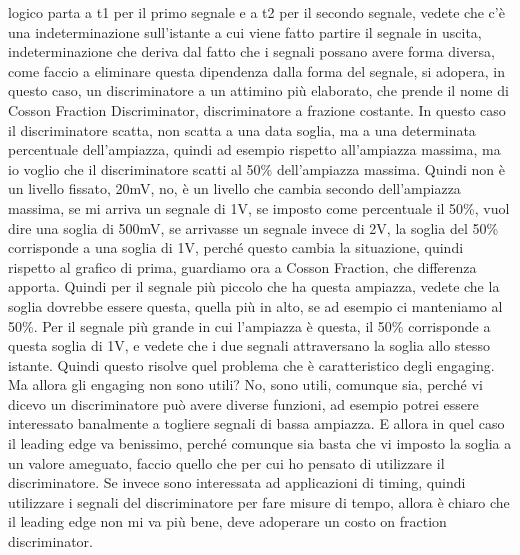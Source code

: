 logico parta a t1 per il primo segnale e a t2 per il secondo segnale, vedete che c'è una indeterminazione sull'istante a cui viene fatto partire il segnale in uscita, indeterminazione che deriva dal fatto che i segnali possano avere forma diversa, come faccio a eliminare questa dipendenza dalla forma del segnale, si adopera, in questo caso, un discriminatore a un attimino più elaborato, che prende il nome di Cosson Fraction Discriminator, discriminatore a frazione costante. In questo caso il discriminatore scatta, non scatta a una data soglia, ma a una determinata percentuale dell'ampiazza, quindi ad esempio rispetto all'ampiazza massima, ma io voglio che il discriminatore scatti al 50\% dell'ampiazza massima. Quindi non è un livello fissato, 20mV, no, è un livello che cambia secondo dell'ampiazza massima, se mi arriva un segnale di 1V, se imposto come percentuale il 50\%, vuol dire una soglia di 500mV, se arrivasse un segnale invece di 2V, la soglia del 50\% corrisponde a una soglia di 1V, perché questo cambia la situazione, quindi rispetto al grafico di prima, guardiamo ora a Cosson Fraction, che differenza apporta. Quindi per il segnale più piccolo che ha questa ampiazza, vedete che la soglia dovrebbe essere questa, quella più in alto, se ad esempio ci manteniamo al 50\%. Per il segnale più grande in cui l'ampiazza è questa, il 50\% corrisponde a questa soglia di 1V, e vedete che i due segnali attraversano la soglia allo stesso istante. Quindi questo risolve quel problema che è caratteristico degli engaging. Ma allora gli engaging non sono utili? No, sono utili, comunque sia, perché vi dicevo un discriminatore può avere diverse funzioni, ad esempio potrei essere interessato banalmente a togliere segnali di bassa ampiazza. E allora in quel caso il leading edge va benissimo, perché comunque sia basta che vi imposto la soglia a un valore ameguato, faccio quello che per cui ho pensato di utilizzare il discriminatore. Se invece sono interessata ad applicazioni di timing, quindi utilizzare i segnali del discriminatore per fare misure di tempo, allora è chiaro che il leading edge non mi va più bene, deve adoperare un costo on fraction discriminator.


